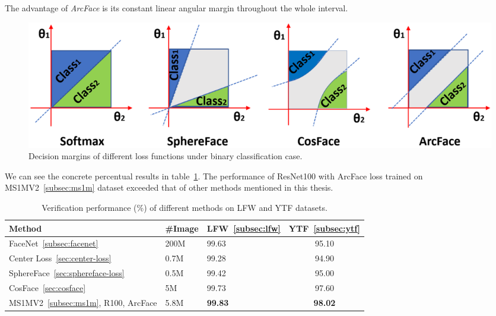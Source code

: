 The advantage of \textit{ArcFace} is its constant linear angular margin throughout the whole interval.

\begin{figure}[H]
    \centering
    \includegraphics[width=\columnwidth]{images/arcface/arcfacecomparison.png}
    \caption{Decision margins of different loss functions under binary classification case.~\cite{ArcFace}}
    \label{fig:arcfacecomp}
\end{figure}

We can see the concrete percentual results in table~\ref{tbl:arcfacecomp}.
The performance of ResNet100 with ArcFace loss trained on MS1MV2~\ref{subsec:ms1m} dataset exceeded that of other
methods mentioned in this thesis.

\begin{table}[H]
    \begin{tabularx}{\textwidth}{l|XXc}
        Method                & \#Image & LFW~\ref{subsec:lfw}            & YTF~\ref{subsec:ytf}            \\ \hline
        FaceNet~\ref{subsec:facenet}               & 200M    & 99.63          & 95.10          \\
        Center Loss~\ref{sec:center-loss}           & 0.7M    & 99.28          & 94.90          \\
        SphereFace~\ref{sec:sphereface-loss}            & 0.5M    & 99.42          & 95.00          \\
        CosFace~\ref{sec:cosface}               & 5M      & 99.73          & 97.60          \\
        MS1MV2~\ref{subsec:ms1m}, R100, ArcFace & 5.8M    & \textbf{99.83} & \textbf{98.02}
    \end{tabularx}
    \caption{Verification performance (\%) of different methods on LFW and YTF datasets.}
    \label{tbl:arcfacecomp}
\end{table}